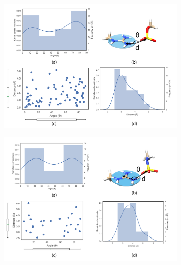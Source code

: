 \documentclass[a4paper, 12pt, openany]{book}
\begin{document}
\begin{figure}
    \centering
    \includegraphics[width=9cm]{Figures/Datamining/arg_sulfate.png}
    \caption{
    }
    \label{fig:my_label}
\end{figure}

\begin{figure}
    \centering
    \includegraphics[width=9cm]{Figures/Datamining/arg_Nsulf.png}
    \caption{
    }
    \label{fig:my_label}
\end{figure}
\end{document}
